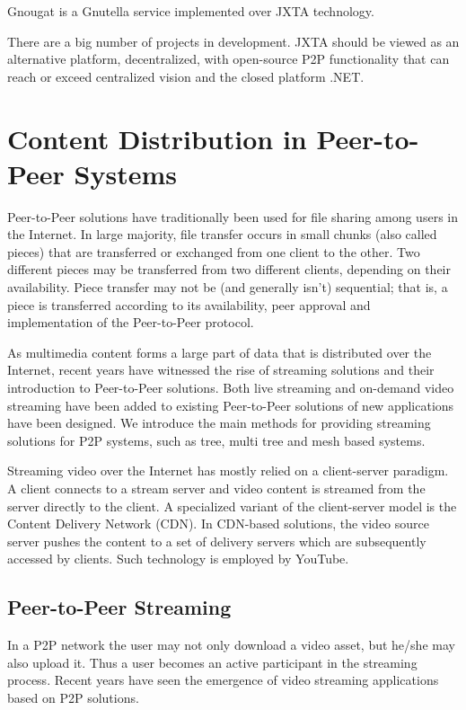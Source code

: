 Gnougat is a Gnutella service implemented over JXTA technology.

There are a big number of projects in development. JXTA should be viewed as an
alternative platform, decentralized, with open-source P2P functionality that
can reach or exceed centralized vision and the closed platform .NET.

\section{Content Distribution in Peer-to-Peer Systems}
\label{sec:p2p-systems:streaming}

Peer-to-Peer solutions have traditionally been used for file sharing among
users in the Internet. In large majority, file transfer occurs in small
chunks (also called pieces) that are transferred or exchanged from one client
to the other. Two different pieces may be transferred from two different
clients, depending on their availability. Piece transfer may not be (and
generally isn't) sequential; that is, a piece is transferred according to its
availability, peer approval and implementation of the Peer-to-Peer protocol.

As multimedia content forms a large part of data that is distributed over the
Internet, recent years have witnessed the rise of streaming solutions and
their introduction to Peer-to-Peer solutions. Both live streaming and
on-demand video streaming have been added to existing Peer-to-Peer solutions
of new applications have been designed. We introduce the main methods for
providing streaming solutions for P2P systems, such as tree, multi tree and
mesh based systems.

Streaming video over the Internet has mostly relied on a client-server
paradigm. A client connects to a stream server and video content is streamed
from the server directly to the client. A specialized variant of the
client-server model is the Content Delivery Network (CDN). In CDN-based
solutions, the video source server pushes the content to a set of delivery
servers which are subsequently accessed by clients. Such technology is
employed by YouTube.

\subsection{Peer-to-Peer Streaming}
\label{subsec:p2p-systems:p2p-streaming-p2p}

In a P2P network the user may not only download a video asset, but he/she may
also upload it. Thus a user becomes an active participant in the streaming
process. Recent years have seen the emergence of video streaming applications
based on P2P solutions.

